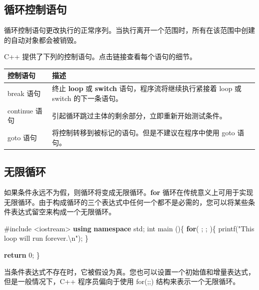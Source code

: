 \documentclass[
]{article}
\newenvironment{Shaded}{}{}
\newcommand{\ControlFlowTok}[1]{\textcolor[rgb]{0.00,0.44,0.13}{\textbf{#1}}}
\newcommand{\DataTypeTok}[1]{\textcolor[rgb]{0.56,0.13,0.00}{#1}}
\newcommand{\DecValTok}[1]{\textcolor[rgb]{0.25,0.63,0.44}{#1}}
\newcommand{\ImportTok}[1]{#1}
\newcommand{\KeywordTok}[1]{\textcolor[rgb]{0.00,0.44,0.13}{\textbf{#1}}}
\newcommand{\NormalTok}[1]{#1}
\newcommand{\OperatorTok}[1]{\textcolor[rgb]{0.40,0.40,0.40}{#1}}
\newcommand{\PreprocessorTok}[1]{\textcolor[rgb]{0.74,0.48,0.00}{#1}}
\newcommand{\SpecialCharTok}[1]{\textcolor[rgb]{0.25,0.44,0.63}{#1}}
\newcommand{\StringTok}[1]{\textcolor[rgb]{0.25,0.44,0.63}{#1}}
\begin{document}
\hypertarget{ux5faaux73afux63a7ux5236ux8bedux53e5}{%
\subsection{循环控制语句}\label{ux5faaux73afux63a7ux5236ux8bedux53e5}}

循环控制语句更改执行的正常序列。当执行离开一个范围时，所有在该范围中创建的自动对象都会被销毁。

C++ 提供了下列的控制语句。点击链接查看每个语句的细节。

\begin{longtable}[]{@{}ll@{}}
\toprule
控制语句 & 描述 \\
\midrule
\endhead
break 语句 & 终止 \textbf{loop} 或 \textbf{switch}
语句，程序流将继续执行紧接着 loop 或 switch 的下一条语句。 \\
continue 语句 & 引起循环跳过主体的剩余部分，立即重新开始测试条件。 \\
goto 语句 & 将控制转移到被标记的语句。但是不建议在程序中使用 goto
语句。 \\
\bottomrule
\end{longtable}

\hypertarget{ux65e0ux9650ux5faaux73af}{%
\subsection{无限循环}\label{ux65e0ux9650ux5faaux73af}}

如果条件永远不为假，则循环将变成无限循环。\textbf{for}
循环在传统意义上可用于实现无限循环。由于构成循环的三个表达式中任何一个都不是必需的，您可以将某些条件表达式留空来构成一个无限循环。

\begin{Shaded}
\begin{Highlighting}[]
\PreprocessorTok{\#include }\ImportTok{\textless{}iostream\textgreater{}}
\KeywordTok{using} \KeywordTok{namespace}\NormalTok{ std}\OperatorTok{;}
\DataTypeTok{int}\NormalTok{ main }\OperatorTok{()\{}
   \ControlFlowTok{for}\OperatorTok{(} \OperatorTok{;} \OperatorTok{;} \OperatorTok{)\{}
\NormalTok{      printf}\OperatorTok{(}\StringTok{"This loop will run forever.}\SpecialCharTok{\textbackslash{}n}\StringTok{"}\OperatorTok{);}
   \OperatorTok{\}}

   \ControlFlowTok{return} \DecValTok{0}\OperatorTok{;}
\OperatorTok{\}}
\end{Highlighting}
\end{Shaded}

当条件表达式不存在时，它被假设为真。您也可以设置一个初始值和增量表达式，但是一般情况下，C++
程序员偏向于使用 for(;;) 结构来表示一个无限循环。
\end{document}
